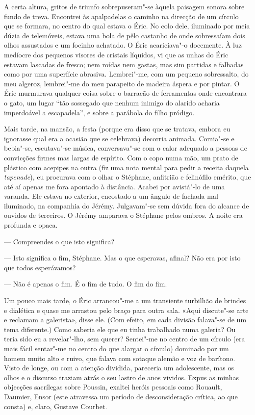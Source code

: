 A certa altura, gritos de triunfo sobrepuseram"-se àquela
paisagem sonora sobre fundo de treva. Encontrei às apalpadelas o
caminho na direcção de um círculo que se formara, no centro do qual
estava o Éric. No colo dele, iluminado por meia dúzia de telemóveis,
estava uma bola de pêlo castanho de onde sobressaíam dois olhos
assustados e um focinho achatado. O Éric acariciava"-o docemente. À luz
medíocre dos pequenos visores de cristais líquidos, vi que as unhas do
Éric estavam lascadas de fresco; nem roídas nem gastas, mas sim partidas
e falhadas como por uma superfície abrasiva. Lembrei"-me, com um pequeno
sobressalto, do meu algeroz, lembrei"-me do meu parapeito de madeira
áspera e por pintar. O Éric murmurava qualquer coisa sobre o barracão de
ferramentas onde encontrara o gato, um lugar ``tão sossegado que
nenhum inimigo do alarido acharia imperdoável a escapadela'', e sobre a
parábola do filho pródigo.

Mais tarde, na mansão, a festa (porque era disso que se tratava,
embora eu ignorasse qual era a ocasião que se celebrava) decorria
animada. Comia"-se e bebia"-se, escutava"-se música, conversava"-se com o
calor adequado a pessoas de convicções firmes mas largas de espírito.
Com o copo numa mão, um prato de plástico com acepipes na outra (fiz
uma nota mental para pedir a receita daquela \emph{tapenade}), eu
procurava com o olhar o Stéphane, anfitrião e felinófilo emérito, que
até aí apenas me fora apontado à distância. Acabei por avistá"-lo de uma
varanda. Ele estava no exterior, encostado a um ângulo de fachada mal
iluminado, na companhia do Jérémy. Julgavam"-se sem dúvida fora do
alcance de ouvidos de terceiros. O Jérémy amparava o Stéphane pelos
ombros. A noite era profunda e opaca.

--- Compreendes o que isto significa?

--- Isto significa o fim, Stéphane. Mas o que esperavas, afinal? Não era
  por isto que todos esperávamos?

--- Não é apenas o fim. É o fim de tudo. O fim do fim.

Um pouco mais
tarde, o Éric arrancou"-me a um transiente turbilhão de brindes e
dialética e quase me arrastou pelo braço
para outra sala. «Aqui discute"-se arte e reclamam a galerista», disse
ele. (Com efeito, em cada divisão falava"-se de um tema diferente.) Como
saberia ele que eu tinha trabalhado numa galeria? Ou teria sido eu a
revelar"-lho, sem querer? Sentei"-me no centro de um círculo (era mais
fácil sentar"-me no centro do que alargar o círculo) dominado por um
homem muito alto e ruivo, que falava com sotaque alemão e voz de
barítono. Visto de longe, ou com a atenção dividida, pareceria um
adolescente, mas os olhos e o discurso traziam atrás o seu lastro de
anos vividos. Expus as minhas objecções sacrílegas sobre Poussin,
exaltei heróis pessoais como Rouault, Daumier, Ensor (este atravessa um
período de desconsideração crítica, ao que consta) e, claro, Gustave
Courbet.

